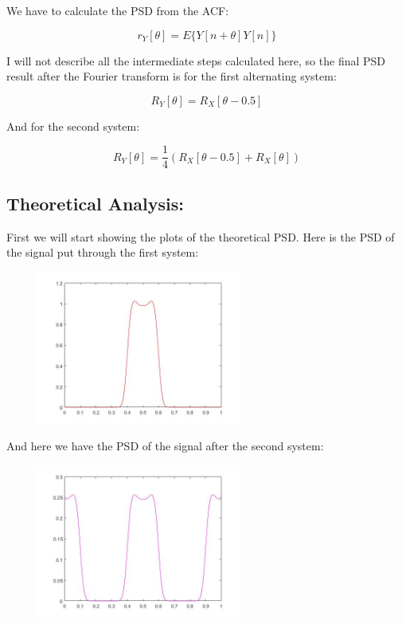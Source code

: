 \documentclass[a4paper,11pt]{article}
\begin{document}
We have to calculate the PSD from the ACF:

\begin{equation}
  r_Y[\theta] = E\{Y[n+\theta]Y[n]\}
\end{equation}

I will not describe all the intermediate steps calculated here, so the final PSD result after the Fourier transform is for the first alternating system:

\begin{equation}
  R_Y[\theta] = R_X[\theta-0.5]
\end{equation}

And for the second system:

\begin{equation}
  R_Y[\theta] = \frac{1}{4}(R_X[\theta-0.5] + R_X[\theta])
\end{equation}

\newpage

\subsection{Theoretical Analysis:}

First we will start showing the plots of the theoretical PSD. Here is the PSD of the signal put through the first system:

\begin{figure}[!hp]
    \begin{center}
    \includegraphics[width=0.6\textwidth]{images/lab4_figure11.jpg}
    \end{center}
\end{figure}

And here we have the PSD of the signal after the second system:

\begin{figure}[!hp]
    \begin{center}
    \includegraphics[width=0.6\textwidth]{images/lab4_figure12.jpg}
    \end{center}
\end{figure}
\end{document}

